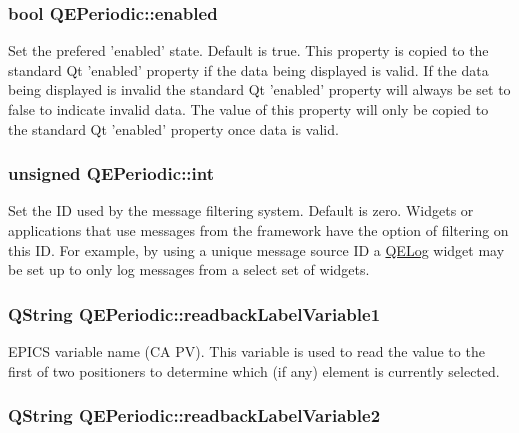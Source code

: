 \hypertarget{classQEPeriodic_a3eb08b1082d27b46ee418415ed42affb}{
\subsubsection[{enabled}]{\setlength{\rightskip}{0pt plus 5cm}bool QEPeriodic::enabled}}
\label{classQEPeriodic_a3eb08b1082d27b46ee418415ed42affb}
Set the prefered 'enabled' state. Default is true. This property is copied to the standard Qt 'enabled' property if the data being displayed is valid. If the data being displayed is invalid the standard Qt 'enabled' property will always be set to false to indicate invalid data. The value of this property will only be copied to the standard Qt 'enabled' property once data is valid. \hypertarget{classQEPeriodic_afe194e700529c05bc2482bd5d80dd462}{
\subsubsection[{int}]{\setlength{\rightskip}{0pt plus 5cm}unsigned QEPeriodic::int}}
\label{classQEPeriodic_afe194e700529c05bc2482bd5d80dd462}
Set the ID used by the message filtering system. Default is zero. Widgets or applications that use messages from the framework have the option of filtering on this ID. For example, by using a unique message source ID a \hyperlink{classQELog}{QELog} widget may be set up to only log messages from a select set of widgets. \hypertarget{classQEPeriodic_a17db6aede735b5456c486f36377efb51}{
\subsubsection[{readbackLabelVariable1}]{\setlength{\rightskip}{0pt plus 5cm}QString QEPeriodic::readbackLabelVariable1}}
\label{classQEPeriodic_a17db6aede735b5456c486f36377efb51}
EPICS variable name (CA PV). This variable is used to read the value to the first of two positioners to determine which (if any) element is currently selected. \hypertarget{classQEPeriodic_ae191db70db9660bc253126a7b33d1f76}{
\subsubsection[{readbackLabelVariable2}]{\setlength{\rightskip}{0pt plus 5cm}QString QEPeriodic::readbackLabelVariable2}}
